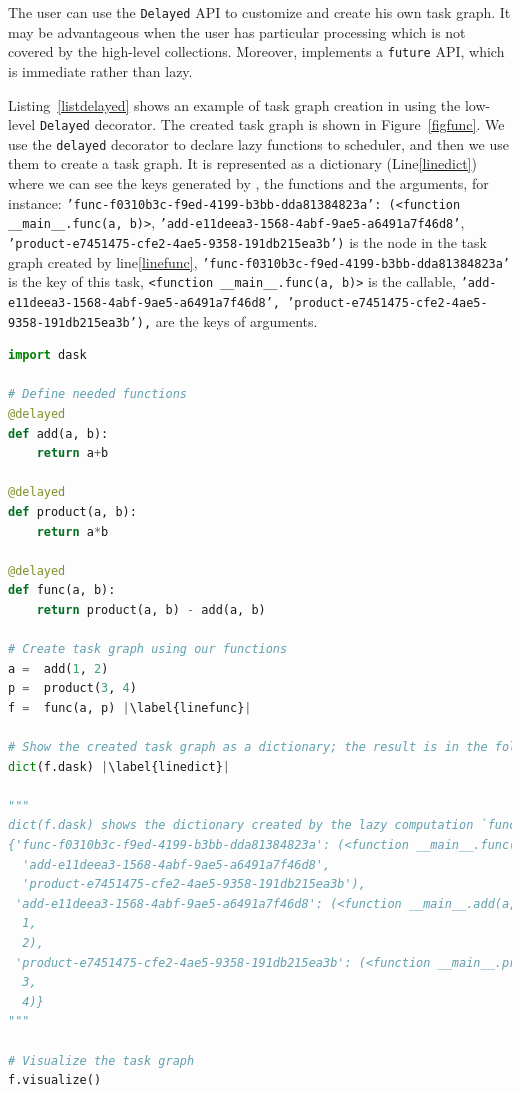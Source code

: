 The user can use the \texttt{Delayed} API to customize and create his own task graph. It may be advantageous when the user has particular processing which is not covered by the high-level collections. 
Moreover, \dask implements a \texttt{future} API, which is immediate rather than lazy. 

Listing~\ref{listdelayed} shows an example of task graph creation in \dask using the low-level \texttt{Delayed} decorator. The created task graph is shown in Figure~\ref{figfunc}. 
We use the \texttt{delayed} decorator to declare lazy functions to \dask scheduler, and then we use them to create a task graph. 
It is represented as a dictionary (Line\ref{linedict}) where we can see the keys generated by \dask, the functions and the arguments, for instance: \texttt{'func-f0310b3c-f9ed-4199-b3bb-dda81384823a': (<function \_\_main\_\_.func(a, b)>}, \texttt{'add-e11deea3-1568-4abf-9ae5-a6491a7f46d8'}, \texttt{'product-e7451475-cfe2-4ae5-9358-191db215ea3b')} is the node in the task graph created by line\ref{linefunc}, \texttt{'func-f0310b3c-f9ed-4199-b3bb-dda81384823a'} is the key of this task, \texttt{<function \_\_main\_\_.func(a, b)>} is the callable, \texttt{'add-e11deea3-1568-4abf-9ae5-a6491a7f46d8',
  'product-e7451475-cfe2-4ae5-9358-191db215ea3b'),} are the keys of arguments. 

\begin{lstlisting}[float=h!, label=listdelayed, language=python, caption=Task graph creation with delayed]
import dask

# Define needed functions
@delayed
def add(a, b):
    return a+b

@delayed 
def product(a, b):
    return a*b

@delayed 
def func(a, b):
    return product(a, b) - add(a, b) 

# Create task graph using our functions 
a =  add(1, 2)
p =  product(3, 4)
f =  func(a, p) |\label{linefunc}|

# Show the created task graph as a dictionary; the result is in the following comment
dict(f.dask) |\label{linedict}|

"""
dict(f.dask) shows the dictionary created by the lazy computation `func` applied to `a` and `p` 
{'func-f0310b3c-f9ed-4199-b3bb-dda81384823a': (<function __main__.func(a, b)>,
  'add-e11deea3-1568-4abf-9ae5-a6491a7f46d8',
  'product-e7451475-cfe2-4ae5-9358-191db215ea3b'),
 'add-e11deea3-1568-4abf-9ae5-a6491a7f46d8': (<function __main__.add(a, b)>,
  1,
  2),
 'product-e7451475-cfe2-4ae5-9358-191db215ea3b': (<function __main__.product(a, b)>,
  3,
  4)}
"""

# Visualize the task graph
f.visualize()

\end{lstlisting}


